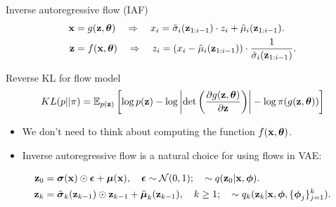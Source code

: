 \begin{frame}{Inverse autoregressive flow (IAF)}
	\vspace{-0.3cm}
	\begin{align*}
		\mathbf{x} &= g(\mathbf{z}, \boldsymbol{\theta}) \quad \Rightarrow \quad x_i = \tilde{\sigma}_i (\mathbf{z}_{1:i-1}) \cdot z_i + \tilde{\mu}_i(\mathbf{z}_{1:i-1}). \\
		\mathbf{z} &= f(\mathbf{x}, \boldsymbol{\theta}) \quad \Rightarrow \quad z_i = \left(x_i - \tilde{\mu}_i(\mathbf{z}_{1:i-1}) \right) \cdot \frac{1}{\tilde{\sigma}_i (\mathbf{z}_{1:i-1})}.
	\end{align*}
	\vspace{-0.5cm}
	\begin{block}{Reverse KL for flow model}
  		\vspace{-0.5cm}
		\[
			KL(p || \pi)  = \mathbb{E}_{p(\mathbf{z})} \left[  \log p(\mathbf{z}) - \log \left|\det \left( \frac{\partial g(\mathbf{z}, \boldsymbol{\theta})}{\partial \mathbf{z}} \right) \right| - \log \pi(g(\mathbf{z}, \boldsymbol{\theta})) \right]
		\]
		\vspace{-0.3cm}
	\end{block}
	\begin{itemize}
	\item We don’t need to think about computing the function $f(\mathbf{x}, \boldsymbol{\theta})$.
	\item Inverse autoregressive flow is a natural choice for using flows in VAE:
	\end{itemize}
	\vspace{-0.3cm}
	\begin{align*}
		\mathbf{z}_0 &= \boldsymbol{\sigma}(\mathbf{x}) \odot \boldsymbol{\epsilon} + \boldsymbol{\mu}(\mathbf{x}), \quad \boldsymbol{\epsilon} \sim \mathcal{N}(0, 1); \quad  \sim q(\mathbf{z}_0 | \mathbf{x}, \boldsymbol{\phi}). \\
		\mathbf{z}_k &= \tilde{\boldsymbol{\sigma}}_k(\mathbf{z}_{k - 1}) \odot \mathbf{z}_{k-1} + \tilde{\boldsymbol{\mu}}_k(\mathbf{z}_{k - 1}), \quad k \geq 1; \quad  \sim q_k(\mathbf{z}_k | \mathbf{x}, \boldsymbol{\phi}, \{\boldsymbol{\phi}_j\}_{j=1}^k).
	\end{align*}
\end{frame}
